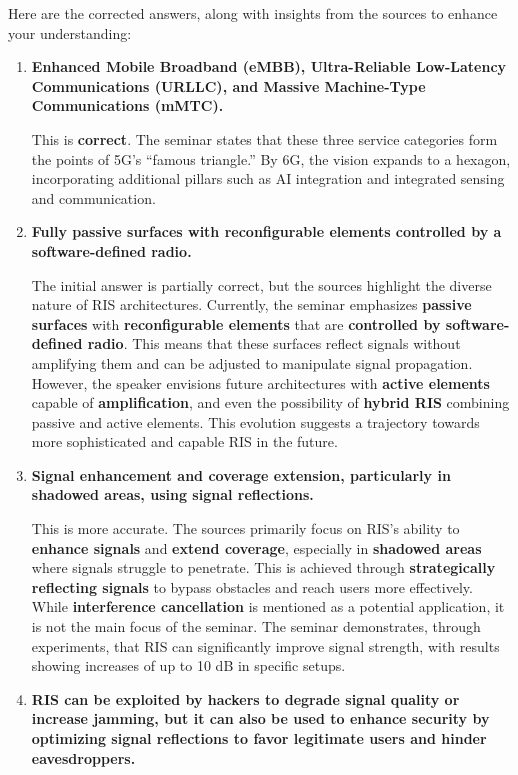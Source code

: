 \documentclass[
]{article}
\author{}
\date{}
\begin{document}
Here are the corrected answers, along with insights from the sources to
enhance your understanding:

\begin{enumerate}
\def\labelenumi{\arabic{enumi}.}
\item
  \textbf{Enhanced Mobile Broadband (eMBB), Ultra-Reliable Low-Latency
  Communications (URLLC), and Massive Machine-Type Communications
  (mMTC).}

  This is \textbf{correct}. The seminar states that these three service
  categories form the points of 5G's ``famous triangle.'' By 6G, the
  vision expands to a hexagon, incorporating additional pillars such as
  AI integration and integrated sensing and communication.
\item
  \textbf{Fully passive surfaces with reconfigurable elements controlled
  by a software-defined radio.}

  The initial answer is partially correct, but the sources highlight the
  diverse nature of RIS architectures. Currently, the seminar emphasizes
  \textbf{passive surfaces} with \textbf{reconfigurable elements} that
  are \textbf{controlled by software-defined radio}. This means that
  these surfaces reflect signals without amplifying them and can be
  adjusted to manipulate signal propagation. However, the speaker
  envisions future architectures with \textbf{active elements} capable
  of \textbf{amplification}, and even the possibility of \textbf{hybrid
  RIS} combining passive and active elements. This evolution suggests a
  trajectory towards more sophisticated and capable RIS in the future.
\item
  \textbf{Signal enhancement and coverage extension, particularly in
  shadowed areas, using signal reflections.}

  This is more accurate. The sources primarily focus on RIS's ability to
  \textbf{enhance signals} and \textbf{extend coverage}, especially in
  \textbf{shadowed areas} where signals struggle to penetrate. This is
  achieved through \textbf{strategically reflecting signals} to bypass
  obstacles and reach users more effectively. While \textbf{interference
  cancellation} is mentioned as a potential application, it is not the
  main focus of the seminar. The seminar demonstrates, through
  experiments, that RIS can significantly improve signal strength, with
  results showing increases of up to 10 dB in specific setups.
\item
  \textbf{RIS can be exploited by hackers to degrade signal quality or
  increase jamming, but it can also be used to enhance security by
  optimizing signal reflections to favor legitimate users and hinder
  eavesdroppers.}


\end{enumerate}
\end{document}
